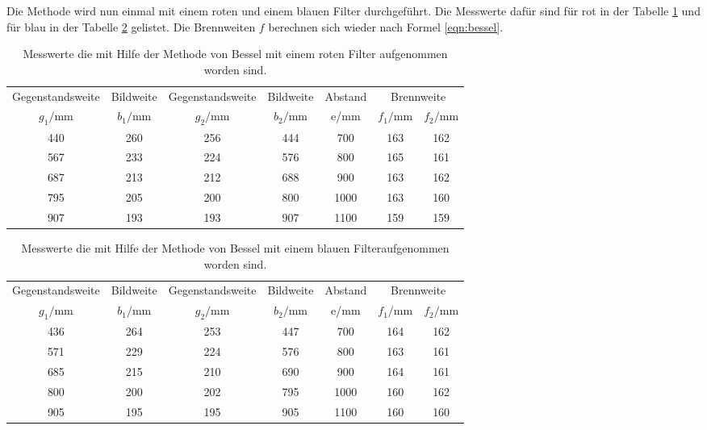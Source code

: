 Die Methode wird nun einmal mit einem  roten und einem blauen Filter durchgeführt.
Die Messwerte dafür sind für rot in der Tabelle \ref{tab:rot} und für blau
in der Tabelle \ref{tab:blau} gelistet.
Die Brennweiten $f$ berechnen sich wieder nach Formel \eqref{eqn:bessel}.

\begin{table}
    \centering
    \caption{Messwerte die mit Hilfe der Methode von Bessel mit einem roten Filter aufgenommen worden sind.}
    \label{tab:rot}
    \begin{tabular}{c c c c c c c}
    \toprule
    Gegenstandsweite   & Bildweite &  Gegenstandsweite   & Bildweite & Abstand  & \multicolumn{2}{c}{Brennweite}\\
    $g_1/\si{\milli\meter}$ & $b_1/\si{\milli\meter}$ &$g_2/\si{\milli\meter}$ & $b_2/\si{\milli\meter}$ & e/\si{\milli\meter} & $f_1/\si{\milli\meter}$ & $f_2/\si{\milli\meter}$\\
    \midrule
    440 & 260 & 256 & 444 & 700  & 163  & 162 \\
    567 & 233 & 224 & 576 & 800  & 165  & 161 \\
    687 & 213 & 212 & 688 & 900  & 163  & 162 \\
    795 & 205 & 200 & 800 & 1000 & 163  & 160 \\
    907 & 193 & 193 & 907 & 1100 & 159  & 159 \\
    \bottomrule
\end{tabular}
\end{table}
\FloatBarrier

\begin{table}
    \centering
    \caption{Messwerte die mit Hilfe der Methode von Bessel mit einem blauen Filteraufgenommen worden sind.}
    \label{tab:blau}
    \begin{tabular}{c c c c c c c}
    \toprule
    Gegenstandsweite   & Bildweite &  Gegenstandsweite   & Bildweite & Abstand  & \multicolumn{2}{c}{Brennweite}\\
    $g_1/\si{\milli\meter}$ & $b_1/\si{\milli\meter}$ &$g_2/\si{\milli\meter}$ & $b_2/\si{\milli\meter}$ & e/\si{\milli\meter} & $f_1/\si{\milli\meter}$ & $f_2/\si{\milli\meter}$\\
    \midrule
    436  & 264  &  253  &  447  &  700  & 164 & 162 \\
    571  & 229  &  224  &  576  &  800  & 163 & 161 \\
    685  & 215  &  210  &  690  &  900  & 164 & 161 \\
    800  & 200  &  202  &  795  &  1000 & 160 & 162 \\
    905  & 195  &  195  &  905  &  1100 & 160 & 160 \\
    \bottomrule
  \end{tabular}
\end{table}
\FloatBarrier

